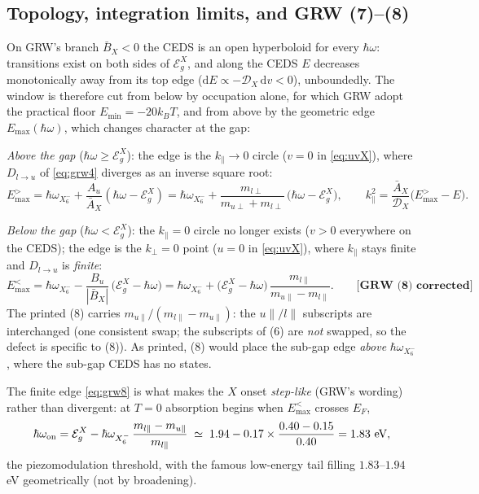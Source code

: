 \documentclass[11pt,a4paper]{article}
\numberwithin{equation}{section}
\newcommand{\hw}{\hbar\omega}
\newcommand{\EgX}{\mathcal{E}_g^{X}}
\newcommand{\cD}{\mathcal{D}}
\newcommand{\AX}{\bar{A}_X}
\newcommand{\BX}{\bar{B}_X}
\newcommand{\kperp}{k_{\perp}}
\newcommand{\kpar}{k_{\parallel}}
\newcommand{\dd}{\mathrm{d}}
\newcommand{\wXsix}{\hbar\omega_{X_6^-}}
\newcommand{\grwfix}[1]{\textbf{[GRW~(#1) corrected]}}
\begin{document}
\subsection{Topology, integration limits, and GRW (7)--(8)}
\label{sec:Xtopology}

On GRW's branch $\BX<0$ the CEDS is an open hyperboloid for every
$\hw$: transitions exist on both sides of $\EgX$, and along the CEDS
$E$ decreases monotonically away from its top edge
($\dd E\propto-\cD_X\,\dd v<0$), unboundedly.  The window is
therefore cut from below by occupation alone, for which GRW adopt the
practical floor $E_{\min}=-20k_BT$, and from above by the geometric
edge $E_{\max}(\hw)$, which changes character at the gap:

\medskip
\noindent
\emph{Above the gap} ($\hw\ge\EgX$): the edge is the $\kpar\to0$
circle ($v=0$ in \eqref{eq:uvX}), where $D_{l\to u}$ of
\eqref{eq:grw4} diverges as an inverse square root:
\begin{equation}
E_{\max}^{>}=\wXsix+\frac{A_u}{\AX}(\hw-\EgX)
=\wXsix+\frac{m_{l\perp}}{m_{u\perp}+m_{l\perp}}\,\bigl(\hw-\EgX\bigr),
\qquad
\kpar^2=\frac{\AX}{\cD_X}\bigl(E_{\max}^{>}-E\bigr).
\label{eq:EmaxAbove}
\end{equation}

\noindent
\emph{Below the gap} ($\hw<\EgX$): the $\kpar=0$ circle no longer
exists ($v>0$ everywhere on the CEDS); the edge is the
$\kperp=0$ point ($u=0$ in \eqref{eq:uvX}), where $\kpar$ stays
finite and $D_{l\to u}$ is \emph{finite}:
\begin{equation}
E_{\max}^{<}
=\wXsix-\frac{B_u}{|\BX|}\,\bigl(\EgX-\hw\bigr)
=\wXsix+\bigl(\EgX-\hw\bigr)\,
\frac{m_{l\parallel}}{m_{u\parallel}-m_{l\parallel}} .
\qquad\grwfix{8}
\label{eq:grw8}
\end{equation}
The printed (8) carries
$m_{u\parallel}/(m_{l\parallel}-m_{u\parallel})$: the
$u\parallel/l\parallel$ subscripts are interchanged (one consistent
swap; the subscripts of (6) are \emph{not} swapped, so the defect is
specific to (8)).  As printed, (8) would place the sub-gap edge
\emph{above} $\wXsix$, where the sub-gap CEDS has no states.

The finite edge \eqref{eq:grw8} is what makes the $X$ onset
\emph{step-like} (GRW's wording) rather than divergent: at $T=0$
absorption begins when $E_{\max}^{<}$ crosses $E_F$,
\begin{equation}
\hw_{\rm on}
=\EgX-\wXsix\,\frac{m_{l\parallel}-m_{u\parallel}}{m_{l\parallel}}
\;\simeq\;1.94-0.17\times\frac{0.40-0.15}{0.40}
=1.83\ \text{eV},
\label{eq:onset}
\end{equation}
the piezomodulation threshold, with the famous low-energy tail
filling $1.83$--$1.94$ eV geometrically (not by broadening).
\end{document}
